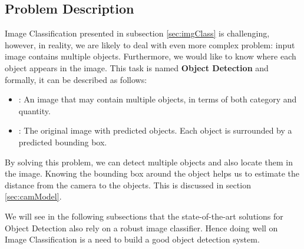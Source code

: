 \subsection{Problem Description}
Image Classification presented in subsection \ref{sec:imgClass} is challenging, however, in reality, we are likely to deal with even more complex problem: input image contains multiple objects. Furthermore, we would like to know where each object appears in the image. This task is named \textbf{Object Detection} and formally, it can be described as follows:
\begin{itemize}
	\item {}: An image that may contain multiple objects, in terms of both category and quantity. 
	\item {}: The original image with predicted objects. Each object is surrounded by a predicted bounding box.
\end{itemize}
By solving this problem, we can detect multiple objects and also locate them in the image. Knowing the bounding box around the object helps us to estimate the distance from the camera to the objects. This is discussed in section \ref{sec:camModel}.

We will see in the following subsections that the state-of-the-art solutions for Object Detection also rely on a robust image classifier. Hence doing well on Image Classification is a need to build a good object detection system.

